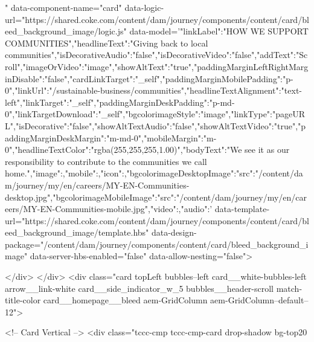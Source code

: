   " data-component-name="card" data-logic-url="https://shared.coke.com/content/dam/journey/components/content/card/bleed_background_image/logic.js" data-model='{"linkLabel":"HOW WE SUPPORT COMMUNITIES","headlineText":"Giving back to local communities","isDecorativeAudio":"false","isDecorativeVideo":"false","addText":"Scroll","imageOrVideo":"image","showAltText":"true","paddingMarginLeftRightMarginDisable":"false","cardLinkTarget":"_self","paddingMarginMobilePadding":"p-0","linkUrl":"/sustainable-business/communities","headlineTextAlignment":"text-left","linkTarget":"_self","paddingMarginDeskPadding":"p-md-0","linkTargetDownload":"_self","bgcolorimageStyle":"image","linkType":"pageURL","isDecorative":"false","showAltTextAudio":"false","showAltTextVideo":"true","paddingMarginDeskMargin":"m-md-0","mobileMargin":"m-0","headlineTextColor":"rgba(255,255,255,1.00)","bodyText":"We see it as our responsibility to contribute to the communities we call home.","image":{},"mobile":{},"icon":{},"bgcolorimageDesktopImage":{"src":"/content/dam/journey/my/en/careers/MY-EN-Communities-desktop.jpg"},"bgcolorimageMobileImage":{"src":"/content/dam/journey/my/en/careers/MY-EN-Communities-mobile.jpg"},"video":{},"audio":{}}' data-template-url="https://shared.coke.com/content/dam/journey/components/content/card/bleed_background_image/template.hbs" data-design-package="/content/dam/journey/components/content/card/bleed_background_image" data-server-hbs-enabled="false" data-allow-nesting="false">
  
  
</div>
</div>
<div class="card topLeft bubbles--left card__white-bubbles-left arrow__link-white card__side_indicator_w_5 bubbles__header-scroll match-title-color card__homepage__bleed aem-GridColumn aem-GridColumn--default--12">
    




  



<!-- Card Vertical -->
<div class="tccc-cmp tccc-cmp-card drop-shadow bg-top20  
  
